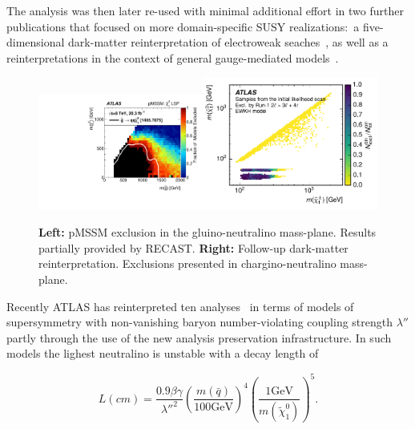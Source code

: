 The analysis was then later re-used with minimal additional effort in two further publications that focused on more domain-specific SUSY realizations:~a five-dimensional dark-matter reinterpretation of electroweak seaches~\cite{Aaboud:2016wna}, as well as a reinterpretations in the context of general gauge-mediated models~\cite{ATLAS-CONF-2016-033}.

\begin{figure}[t]
\begin{center}
\includegraphics[width=0.48\textwidth,angle=0]{ch5-figures/pMSSM.pdf}\includegraphics[width=0.52\textwidth,angle=0]{ch5-figures/DM.pdf}

\end{center}
\caption{
{\bf Left:} pMSSM exclusion in the gluino-neutralino mass-plane. Results partially provided by RECAST.
{\bf Right:} Follow-up dark-matter reinterpretation. Exclusions presented in chargino-neutralino mass-plane.
}
\label{fig:recast-cc}
\end{figure}

Recently ATLAS has reinterpreted ten analyses~\cite{ATLAS-CONF-2018-003} in terms of models of supersymmetry with non-vanishing baryon number-violating coupling strength $\lambda''$ partly through the use of the new analysis preservation infrastructure. In such models the lighest neutralino is unstable with a decay length of

\begin{equation}
  L(cm) = \frac{0.9\beta\gamma}{{\lambda''}^2} \left(\frac{m(\bar{q})}{100\mathrm{GeV}}\right)^4\left(\frac{1\mathrm{GeV}}{m(\tilde{\chi}_1^0)}\right)^5.
\end{equation}

